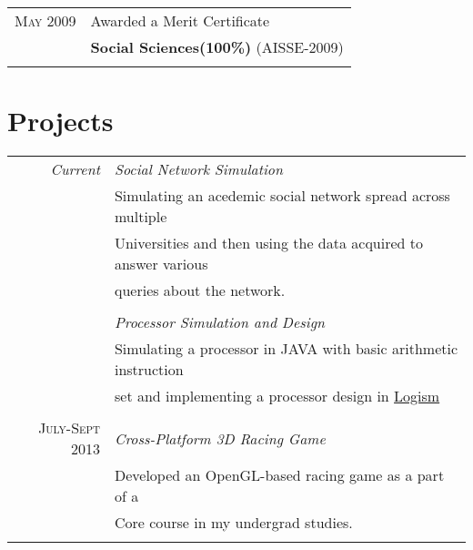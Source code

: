 \documentclass[10pt]{article} %
\begin{document}
{\begin{minipage}[t]{0.5\textwidth}
\begin{tabular}{rl}
\textsc{May} 2009 & Awarded a Merit Certificate \\
& \textbf{Social Sciences(100\%) }\footnotesize(AISSE-2009)\normalsize\\\\

\end{tabular}


\section{Projects}

\begin{tabular}{r|p{11cm}}
\emph{Current} &  \emph{Social Network Simulation}\\
& \footnotesize{Simulating an acedemic social network spread across multiple} \\
& \footnotesize{Universities and then using the data acquired to answer various}\\
& \footnotesize{queries about the network.}\\
\multicolumn{2}{c}{} \\


 &  \emph{Processor Simulation and Design}\\
& \footnotesize{Simulating a processor in JAVA with basic arithmetic instruction}\\
& \footnotesize{set and implementing a processor design in \href{http://ozark.hendrix.edu/~burch/logisim/}{Logism}}\\
\multicolumn{2}{c}{} \\

\textsc{July-Sept 2013} &  \emph{Cross-Platform 3D Racing Game}\\
& \footnotesize{Developed an OpenGL-based racing game as a part of a }\\
& \footnotesize{Core course in my undergrad studies.}\\
\multicolumn{2}{c}{} \\



\end{tabular}



\end{minipage}}
\end{document}
